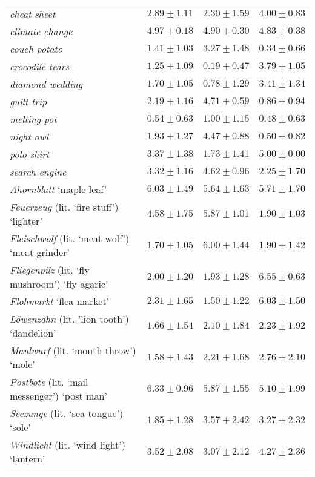 \documentclass[output=paper,colorlinks,citecolor=brown]{langscibook}
\begin{document}
\begin{table}
\begin{tabular}{l ccc}
      \textit{cheat sheet}     & $2.89\pm 1.11$ & $2.30\pm 1.59$ & $4.00\pm 0.83$  \\
      \textit{climate change}  & $4.97\pm 0.18$ & $4.90\pm 0.30$ & $4.83\pm 0.38$  \\
      \textit{couch potato}    & $1.41\pm 1.03$ & $3.27\pm 1.48$ & $0.34\pm 0.66$  \\
      \textit{crocodile tears} & $1.25\pm 1.09$ & $0.19\pm 0.47$ & $3.79\pm 1.05$  \\
      \textit{diamond wedding} & $1.70\pm 1.05$ & $0.78\pm 1.29$ & $3.41\pm 1.34$  \\
      \textit{guilt trip}      & $2.19\pm 1.16$ & $4.71\pm 0.59$ & $0.86\pm 0.94$  \\
      \textit{melting pot}     & $0.54\pm 0.63$ & $1.00\pm 1.15$ & $0.48\pm 0.63$  \\
      \textit{night owl}       & $1.93\pm 1.27$ & $4.47\pm 0.88$ & $0.50\pm 0.82$  \\
      \textit{polo shirt}      & $3.37\pm 1.38$ & $1.73\pm 1.41$ & $5.00\pm 0.00$  \\
      \textit{search engine}   & $3.32\pm 1.16$ & $4.62\pm 0.96$ & $2.25\pm 1.70$ \\
      \midrule
      \textit{Ahornblatt} `maple leaf'                     & $6.03\pm 1.49$ & $5.64\pm 1.63$ & $5.71\pm 1.70$\\
      \textit{Feuerzeug} (lit. `fire stuff') `lighter'        & $4.58\pm 1.75$ & $5.87\pm 1.01$ & $1.90\pm 1.03$ \\
      \textit{Fleischwolf} (lit. `meat wolf') `meat grinder'  & $1.70\pm 1.05$ & $6.00\pm 1.44$ & $1.90\pm 1.42$ \\
      \textit{Fliegenpilz} (lit. `fly mushroom') `fly agaric' & $2.00\pm 1.20$ & $1.93\pm 1.28$ & $6.55\pm 0.63$ \\
      \textit{Flohmarkt} `flea market'                     & $2.31\pm 1.65$ & $1.50\pm 1.22$ & $6.03\pm 1.50$ \\
      \textit{Löwenzahn} (lit. 'lion tooth') `dandelion'      & $1.66\pm 1.54$ & $2.10\pm 1.84$ & $2.23\pm 1.92$ \\
      \textit{Maulwurf} (lit. `mouth throw') `mole'           & $1.58\pm 1.43$ & $2.21\pm 1.68$ & $2.76\pm 2.10$ \\
      \textit{Postbote} (lit. `mail messenger') `post man'    & $6.33\pm 0.96$ & $5.87\pm 1.55$ & $5.10\pm 1.99$\\
      \textit{Seezunge} (lit. `sea tongue') `sole'            & $1.85\pm 1.28$ & $3.57\pm 2.42$ & $3.27\pm 2.32$ \\
      \textit{Windlicht} (lit. `wind light') `lantern'        & $3.52\pm 2.08$ & $3.07\pm 2.12$ & $4.27\pm 2.36$ \\

  \lspbottomrule
  \end{tabular}
\end{table}
\end{document}

